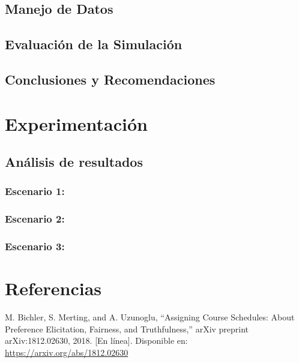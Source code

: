 \documentclass{article}
\begin{document}
\subsection{Manejo de Datos}

\subsection{Evaluación de la Simulación}


\subsection{Conclusiones y Recomendaciones}



\section{Experimentación}\label{sec:exp}

\subsection{Análisis de resultados}

\subsubsection{Escenario 1: }

\subsubsection{Escenario 2: }
 
\subsubsection{Escenario 3: }


\section{Referencias}
\renewcommand{\refname}{}

\begin{thebibliography}{9}

 \label{ref:BPS} M. Bichler, S. Merting, and A. Uzunoglu, 
“Assigning Course Schedules: About Preference Elicitation, Fairness, and Truthfulness,” 
arXiv preprint arXiv:1812.02630, 2018. [En línea]. Disponible en: 
\url{https://arxiv.org/abs/1812.02630}


\end{thebibliography}
\end{document}
